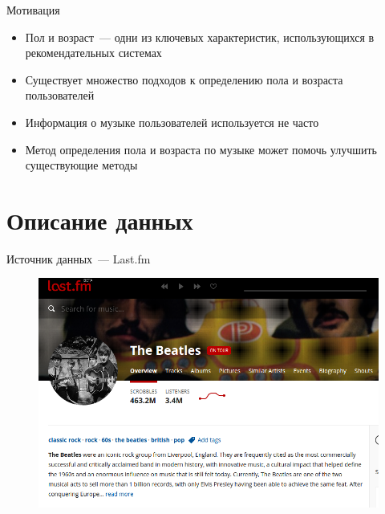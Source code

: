 \documentclass{beamer}
\begin{document}
\begin{frame}{Мотивация}
    \begin{itemize}
        \item {Пол и возраст~--- одни из ключевых характеристик,
            использующихся в рекомендательных системах}
        \item {Существует множество подходов к определению пола
            и возраста пользователей}
        \item {Информация о музыке пользователей используется не часто}
        \item {Метод определения пола и возраста по музыке
            может помочь улучшить существующие методы}
    \end{itemize}
\end{frame}

\section{Описание данных}

\begin{frame}{Источник данных~--- Last.fm}
    \begin{figure}
        \includegraphics[width=\textwidth]{figures/lastfm.png}
    \end{figure}
\end{frame}
\end{document}
